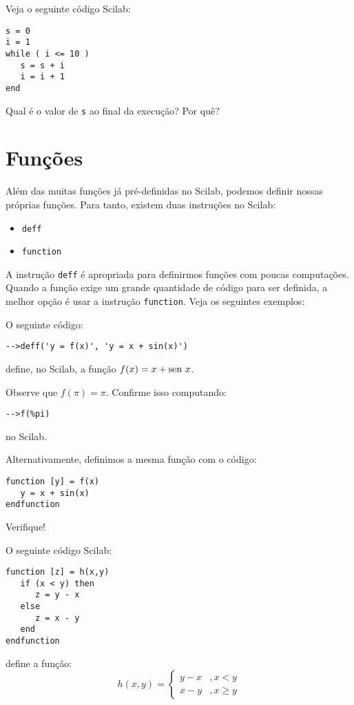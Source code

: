 \begin{ex}
Veja o seguinte código Scilab:
\begin{verbatim}
s = 0
i = 1
while ( i <= 10 )
   s = s + i
   i = i + 1
end
\end{verbatim}
Qual é o valor de \verb+s+ ao final da execução? Por quê?
\end{ex}

\section{Funções}

Além das muitas funções já pré-definidas no Scilab, podemos definir nossas próprias funções. Para tanto, existem duas instruções no Scilab:
\begin{itemize}
\item \verb+deff+
\item \verb+function+
\end{itemize}

A instrução \verb+deff+ é apropriada para definirmos funções com poucas computações. Quando a função exige um grande quantidade de código para ser definida, a melhor opção é usar a instrução \verb+function+. Veja os seguintes exemplos:

\begin{ex}
  O seguinte código:
\begin{verbatim}
-->deff('y = f(x)', 'y = x + sin(x)')
\end{verbatim}
define, no Scilab, a função $f(x) = x + \operatorname{sen}\, x$.

Observe que $f(\pi) = \pi$. Confirme isso computando:
\begin{verbatim}
-->f(%pi)
\end{verbatim}
no Scilab.

Alternativamente, definimos a mesma função com o código:
\begin{verbatim}
function [y] = f(x)
   y = x + sin(x)
endfunction
\end{verbatim}
Verifique!
\end{ex}

\begin{ex}
  O seguinte código Scilab:
\begin{verbatim}
function [z] = h(x,y)
   if (x < y) then
      z = y - x
   else
      z = x - y
   end
endfunction
\end{verbatim}
define a função:
\begin{equation}
  h(x,y) = \left\{
    \begin{array}{ll}
      y - x &, x < y\\
      x - y &, x \geq y
    \end{array}
\right.
\end{equation}
\end{ex}

